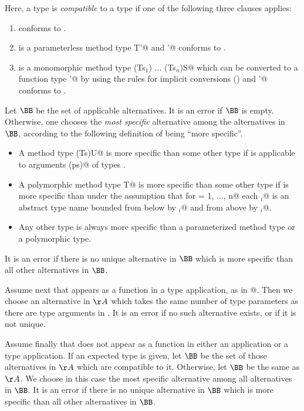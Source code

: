 \documentclass[11pt]{report}
\begin{document}
Here, a type \verb@T@ is {\em compatible} to a type \verb@U@ if one of the
following three clauses applies:
\begin{enumerate}
\item
\verb@T@ conforms to \verb@U@.
\item
\verb@T@ is a parameterless method type \verb@[]T'@ and \verb@T'@
conforms to \verb@U@.
\item 
\verb@T@ is a monomorphic method type \verb@(Ts$_1$) ... (Ts$_n$)S@ which
can be converted to a function type \verb@T'@ by using the rules for
implicit conversions () and \verb@T'@ conforms to
\verb@U@.
\end{enumerate}

Let $\BB$ be the set of applicable alternatives. It is an error if
$\BB$ is empty. Otherwise, one chooses the {\em most specific}
alternative among the alternatives in $\BB$, according to the
following definition of being ``more specific''.
\begin{itemize} 
\item
A method type \verb@(Ts)U@ is more specific than some other
type \verb@S@ if \verb@S@ is applicable to arguments \verb@(ps)@ of
types \verb@Ts@.
\item
A polymorphic method type
\verb@[a$_1$ >: L$_1$ <: U$_1$, ..., a$_n$ >: L$_n$ <: U$_n$]T@ is
more specific than some other type \verb@S@ if \verb@T@ is more
specific than \verb@S@ under the assumption that for
\verb@i = 1, ..., n@ each \verb@a$_i$@ is an abstract type name
bounded from below by \verb@L$_i$@ and from above by \verb@U$_i$@.
\item
Any other type is always more specific than a parameterized method
type or a polymorphic type.
\end{itemize}
It is an error if there is no unique alternative in $\BB$ which is
more specific than all other alternatives in $\BB$.

Assume next that \verb@f@ appears as a function in a type
application, as in \verb@f[targs]@. Then we choose an alternative in
$\AA$ which takes the same number of type parameters as there are
type arguments in \verb@targs@. It is an error if no such alternative
exists, or if it is not unique.

Assume finally that \verb@f@ does not appear as a function in either
an application or a type application. If an expected type is given,
let $\BB$ be the set of those alternatives in $\AA$ which are
compatible to it. Otherwise, let $\BB$ be the same as $\AA$.
We choose in this case the most specific alternative among all
alternatives in $\BB$. It is an error if there is no unique
alternative in $\BB$ which is more specific than all other
alternatives in $\BB$.
\end{document}
